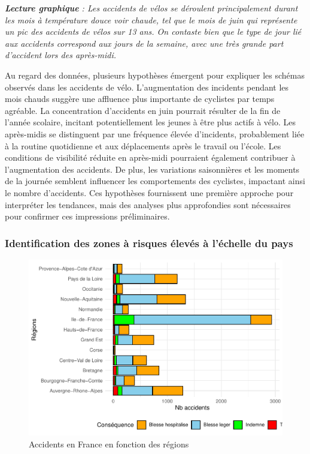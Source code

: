 \documentclass[french,]{compterendu}
\theoremstyle{urcastyle}
\theoremstyle{remark}
\begin{document}
\emph{\textbf{Lecture graphique} : Les accidents de vélos se déroulent principalement durant les mois à température douce voir chaude, tel que le mois de juin qui représente un pic des accidents de vélos sur 13 ans. On contaste bien que le type de jour lié aux accidents correspond aux jours de la semaine, avec une très grande part d'accident lors des après-midi.}

Au regard des données, plusieurs hypothèses émergent pour expliquer les schémas observés dans les accidents de vélo. L'augmentation des incidents pendant les mois chauds suggère une affluence plus importante de cyclistes par temps agréable. La concentration d'accidents en juin pourrait résulter de la fin de l'année scolaire, incitant potentiellement les jeunes à être plus actifs à vélo. Les après-midis se distinguent par une fréquence élevée d'incidents, probablement liée à la routine quotidienne et aux déplacements après le travail ou l'école. Les conditions de visibilité réduite en après-midi pourraient également contribuer à l'augmentation des accidents. De plus, les variations saisonnières et les moments de la journée semblent influencer les comportements des cyclistes, impactant ainsi le nombre d'accidents. Ces hypothèses fournissent une première approche pour interpréter les tendances, mais des analyses plus approfondies sont nécessaires pour confirmer ces impressions préliminaires.

\hypertarget{identification-des-zones-uxe0-risques-uxe9levuxe9s-uxe0-luxe9chelle-du-pays}{%
\subsubsection{Identification des zones à risques élevés à l'échelle du pays}\label{identification-des-zones-uxe0-risques-uxe9levuxe9s-uxe0-luxe9chelle-du-pays}}

\begin{figure}[H]

{\centering \includegraphics[width=0.9\linewidth]{Rapport_ADD_LEO-GABET_files/figure-latex/accfranceregion-1} 

}

\caption{Accidents en France en fonction des régions}\label{fig:accfranceregion}
\end{figure}
\end{document}
